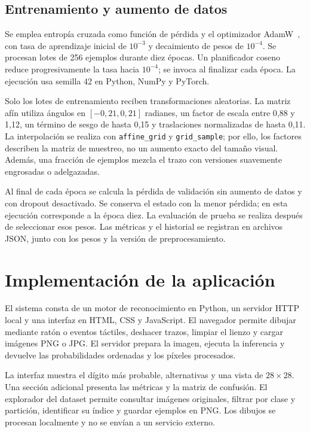 \documentclass[conference]{IEEEtran}
\begin{document}
\subsection{Entrenamiento y aumento de datos}
Se emplea entropía cruzada como función de pérdida y el optimizador AdamW~\cite{adamw}, con tasa de aprendizaje inicial de $10^{-3}$ y decaimiento de pesos de $10^{-4}$. Se procesan lotes de 256 ejemplos durante diez épocas. Un planificador coseno reduce progresivamente la tasa hacia $10^{-4}$; se invoca al finalizar cada época. La ejecución usa semilla 42 en Python, NumPy y PyTorch.

Solo los lotes de entrenamiento reciben transformaciones aleatorias. La matriz afín utiliza ángulos en $[-0{,}21,0{,}21]$ radianes, un factor de escala entre 0,88 y 1,12, un término de sesgo de hasta 0,15 y traslaciones normalizadas de hasta 0,11. La interpolación se realiza con \texttt{affine\_grid} y \texttt{grid\_sample}; por ello, los factores describen la matriz de muestreo, no un aumento exacto del tamaño visual. Además, una fracción de ejemplos mezcla el trazo con versiones suavemente engrosadas o adelgazadas.

Al final de cada época se calcula la pérdida de validación sin aumento de datos y con dropout desactivado. Se conserva el estado con la menor pérdida; en esta ejecución corresponde a la época diez. La evaluación de prueba se realiza después de seleccionar esos pesos. Las métricas y el historial se registran en archivos JSON, junto con los pesos y la versión de preprocesamiento.

\section{Implementación de la aplicación}
El sistema consta de un motor de reconocimiento en Python, un servidor HTTP local y una interfaz en HTML, CSS y JavaScript. El navegador permite dibujar mediante ratón o eventos táctiles, deshacer trazos, limpiar el lienzo y cargar imágenes PNG o JPG. El servidor prepara la imagen, ejecuta la inferencia y devuelve las probabilidades ordenadas y los píxeles procesados.

La interfaz muestra el dígito más probable, alternativas y una vista de $28\times28$. Una sección adicional presenta las métricas y la matriz de confusión. El explorador del dataset permite consultar imágenes originales, filtrar por clase y partición, identificar su índice y guardar ejemplos en PNG. Los dibujos se procesan localmente y no se envían a un servicio externo.
\end{document}

